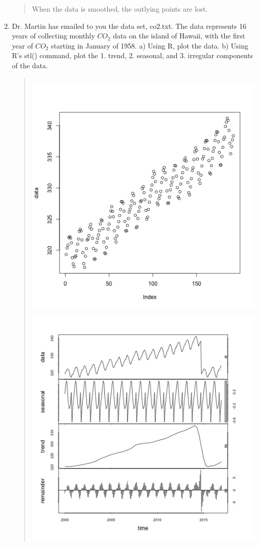 \documentclass{hw}
\begin{document}
\begin{enumerate}
\begin{quote}
\begin{minipage}{0.5\textwidth}
\end{minipage}
When the data is smoothed, the outlying points are lost.
\end{quote}

\newpage
\item Dr. Martin has emailed to you the data set, co2.txt. The data represents 16 years of collecting
monthly $CO_{2}$ data on the island of Hawaii, with the first year of $CO_{2}$ starting in January of
1958. a) Using R, plot the data. b) Using R’s stl() command, plot the 1. trend, 2. seasonal, and 3.
irregular components of the data.
\begin{quote}
\inputminted{r}{num_two.R}
\begin{minipage}{0.5\textwidth}
\includegraphics[scale=0.4]{02data_plot}
\end{minipage}
\begin{minipage}{0.5\textwidth}
\includegraphics[scale=0.4]{02seasonal}

\end{minipage}
\end{quote}
\end{enumerate}
\end{document}

